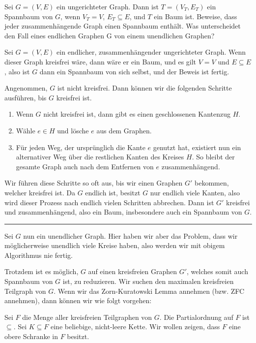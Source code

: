 \documentclass[12pt]{article}
\begin{document}
\begin{problem}{}{}
    Sei $G = (V, E)$ ein ungerichteter Graph. Dann ist $T = (V_T,E_T)$ ein Spannbaum von $G$, wenn $V_T = V$, $E_T \subseteq E$, und $T$ ein Baum ist. Beweise, dass jeder zusammenhängende Graph einen Spannbaum enthält. Was unterscheidet den Fall eines endlichen Graphen G von einem unendlichen Graphen?
\end{problem}

Sei $G = (V, E)$ ein endlicher, zusammenhängender ungerichteter Graph. Wenn dieser Graph kreisfrei wäre, dann wäre er ein Baum, und es gilt $V = V$ und $E \subseteq E$, also ist $G$ dann ein Spannbaum von sich selbst, und der Beweis ist fertig.

Angenommen, $G$ ist nicht kreisfrei. Dann können wir die folgenden Schritte ausführen, bis $G$ kreisfrei ist.

\begin{enumerate}
    \item Wenn $G$ nicht kreisfrei ist, dann gibt es einen geschlossenen Kantenzug $H$.
    \item Wähle $e \in H$ und lösche $e$ aus dem Graphen.
    \item Für jeden Weg, der ursprünglich die Kante $e$ genutzt hat, existiert nun ein alternativer Weg über die restlichen Kanten des Kreises $H$. So bleibt der gesamte Graph auch nach dem Entfernen von $e$ zusammenhängend.
\end{enumerate}

Wir führen diese Schritte so oft aus, bis wir einen Graphen $G'$ bekommen, welcher kreisfrei ist. Da $G$ endlich ist, besitzt $G$ nur endlich viele Kanten, also wird dieser Prozess nach endlich vielen Schritten abbrechen. Dann ist $G'$ kreisfrei und zusammenhängend, also ein Baum, insbesondere auch ein Spannbaum von $G$.

\hrule

Sei $G$ nun ein unendlicher Graph. Hier haben wir aber das Problem, dass wir möglicherweise unendlich viele Kreise haben, also werden wir mit obigem Algorithmus nie fertig.

Trotzdem ist es möglich, $G$ auf einen kreisfreien Graphen $G'$, welches somit auch Spannbaum von $G$ ist, zu reduzieren. Wir suchen den maximalen kreisfreien Teilgraph von $G$. Wenn wir das Zorn-Kuratowski Lemma annehmen (bzw. ZFC annehmen), dann können wir wie folgt vorgehen:

Sei $F$ die Menge aller kreisfreien Teilgraphen von $G$. Die Partialordnung auf $F$ ist $\subseteq$. Sei $K \subseteq F$ eine beliebige, nicht-leere Kette. Wir wollen zeigen, dass $F$ eine obere Schranke in $F$ besitzt.
\end{document}

